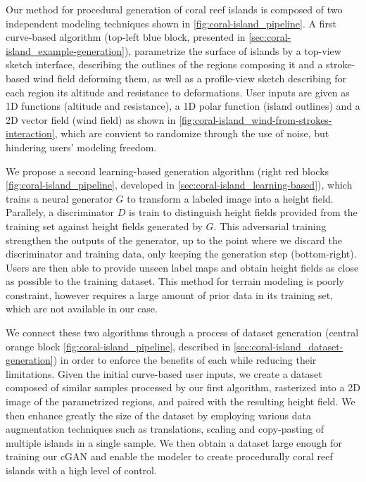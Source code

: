 Our method for procedural generation of coral reef islands is composed of two independent modeling techniques shown in \cref{fig:coral-island_pipeline}. A first curve-based algorithm  (top-left blue block, presented in \cref{sec:coral-island_example-generation}), parametrize the surface of islands by a top-view sketch interface, describing the outlines of the regions composing it and a stroke-based wind field deforming them, as well as a profile-view sketch describing for each region its altitude and resistance to deformations. User inputs are given as 1D functions (altitude and resistance), a 1D polar function (island outlines) and a 2D vector field (wind field) as shown in \cref{fig:coral-island_wind-from-strokes-interaction}, which are convient to randomize through the use of noise, but hindering users' modeling freedom.

We propose a second learning-based generation algorithm (right red blocks \cref{fig:coral-island_pipeline}, developed in \cref{sec:coral-island_learning-based}), which trains a neural generator $G$ to transform a labeled image into a height field. Parallely, a discriminator $D$ is train to distinguish height fields provided from the training set against height fields generated by $G$. This adversarial training strengthen the outputs of the generator, up to the point where we discard the discriminator and training data, only keeping the generation step (bottom-right). Users are then able to provide unseen label maps and obtain height fields as close as possible to the training dataset. This method for terrain modeling is poorly constraint, however requires a large amount of prior data in its training set, which are not available in our case.

We connect these two algorithms through a process of dataset generation (central orange block \cref{fig:coral-island_pipeline}, described in \cref{sec:coral-island_dataset-generation}) in order to enforce the benefits of each while reducing their limitations. Given the initial curve-based user inputs, we create a dataset composed of similar samples processed by our first algorithm, rasterized into a 2D image of the parametrized regions, and paired with the resulting height field. We then enhance greatly the size of the dataset by employing various data augmentation techniques such as translations, scaling and copy-pasting of multiple islands in a single sample. We then obtain a dataset large enough for training our cGAN and enable the modeler to create procedurally coral reef islands with a high level of control.



